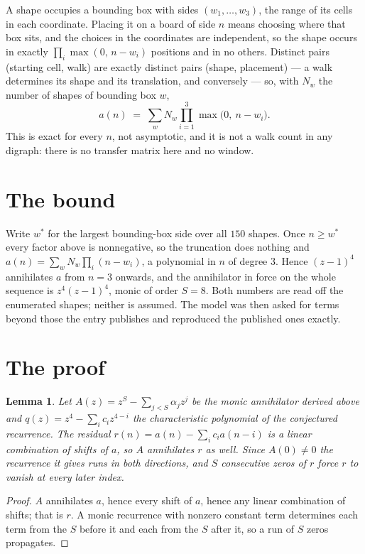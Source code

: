 \documentclass[11pt,a4paper]{article}
\theoremstyle{plain}
\newtheorem{lemma}[theorem]{Lemma}
\theoremstyle{definition}
\begin{document}
A shape occupies a bounding box with sides $(w_1,\dots,w_{3})$, the range of its cells in each
coordinate. Placing it on a board of side $n$ means choosing where that box sits, and the
choices in the coordinates are independent, so the shape occurs in exactly
$\prod_{i}\max(0,\,n-w_i)$ positions and in no others. Distinct pairs (starting cell,
walk) are exactly distinct pairs (shape, placement) --- a walk determines its shape and its
translation, and conversely --- so, with $N_w$ the number of shapes of bounding box $w$,
\[
a(n)\;=\;\sum_{w} N_w \prod_{i=1}^{3}\max\bigl(0,\ n-w_i\bigr).
\]
This is exact for every $n$, not asymptotic, and it is not a walk count in any digraph: there is
no transfer matrix here and no window.

\section{The bound}

Write $w^\ast$ for the largest bounding-box side over all $150$ shapes. Once $n\ge w^\ast$
every factor above is nonnegative, so the truncation does nothing and
$a(n)=\sum_w N_w\prod_i(n-w_i)$, a polynomial in $n$ of degree $3$. Hence $(z-1)^{4}$
annihilates $a$ from $n=3$ onwards, and the annihilator in force on the whole sequence is
$z^{4}(z-1)^{4}$, monic of order $S=8$. Both numbers are read off the enumerated
shapes; neither is assumed. The model was then asked for terms beyond those the entry publishes
and reproduced the published ones exactly.

\section{The proof}

\begin{lemma}\label{lem:crit}
Let $A(z)=z^S-\sum_{j<S}\alpha_jz^{j}$ be the monic annihilator derived above and
$q(z)=z^{4}-\sum_ic_iz^{4-i}$ the characteristic polynomial of the conjectured
recurrence. The residual $r(n)=a(n)-\sum_ic_ia(n-i)$ is a linear combination of shifts of $a$,
so $A$ annihilates $r$ as well. Since $A(0)\ne0$ the recurrence it gives runs in both
directions, and $S$ consecutive zeros of $r$ force $r$ to vanish at every later index.
\end{lemma}

\begin{proof}
$A$ annihilates $a$, hence every shift of $a$, hence any linear combination of shifts; that is
$r$. A monic recurrence with nonzero constant term determines each term from the $S$ before it
and each from the $S$ after it, so a run of $S$ zeros propagates.
\end{proof}
\end{document}
